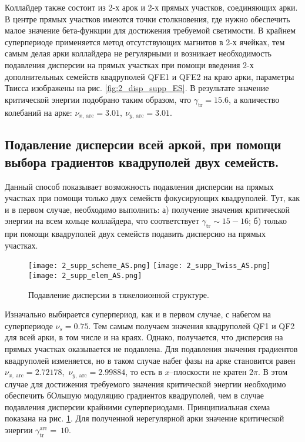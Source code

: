 \par Коллайдер также состоит из 2-х арок и 2-х прямых участков, соединяющих арки. В центре прямых участков имеются точки столкновения, где нужно обеспечить малое значение бета-функции для достижения требуемой светимости. В крайнем суперпериоде применяется метод отсутствующих магнитов в 2-х ячейках, тем самым делая арки коллайдера не регулярными и возникает необходимость подавления дисперсии на прямых участках при помощи введения 2-х дополнительных семейств квадруполей QFE1 и QFE2 на краю арки, параметры Твисса изображены на рис. \ref{fig:2_disp_supp_ES}. В результате значение критической энергии подобрано таким образом, что $\gamma_{\text{tr}}=15.6$, а количество колебаний на арке: $\nu_{x,\ \text{arc}}=3.01,\ \nu_{y,\ \text{arc}}=3.01$.

\subsection{Подавление дисперсии всей аркой, при помощи выбора градиентов квадруполей двух семейств.}\label{subsec:transition_variation/methods/disp_supperssion_AS}	

Данный способ показывает возможность подавления дисперсии на прямых участках при помощи только двух семейств фокусирующих квадруполей. Тут, как и в первом случае, необходимо выполнить:
	а) получение значения критической энергии на всем кольце коллайдера, что соответствует $\gamma_{\text{tr}}\sim15-16$;
	б) только при помощи квадруполей двух семейств подавить дисперсию на прямых участках.

\begin{figure} [h!]
	\center
	\texttt{[image: 2\_supp\_scheme\_AS.png]}
	\texttt{[image: 2\_supp\_Twiss\_AS.png]}
	\texttt{[image: 2\_supp\_elem\_AS.png]}
	\caption{Подавление дисперсии в тяжелоионной структуре.}
	\label{fig:2_disp_supp_AS}
\end{figure}
	
\par Изначально выбирается суперпериод, как и в первом случае, с набегом на суперпериоде $\nu_s=0.75$. Тем самым получаем значения квадруполей QF1 и QF2 для всей арки, в том числе и на краях. Однако, получается, что дисперсия на прямых участках оказывается не подавлена. Для подавления значения градиентов квадруполей изменяется, но в таком случае набег фазы на арке становится равен $\nu_{x,\ \text{arc}}=2.72178$,\ $\nu_{y,\ \text{arc}}=2.99884$, то есть в $x$–плоскости не кратен $2\pi$. В этом случае для достижения требуемого значения критической энергии необходимо обеспечить бОльшую модуляцию градиентов квадруполей, чем в случае подавления дисперсии крайними суперпериодами. Принципиальная схема показана на рис. \ref{fig:2_disp_supp_AS}. Для полученной нерегулярной арки значение критической энергии $\gamma_{\text{tr}}^{\text{arc}}=\ 10$.

